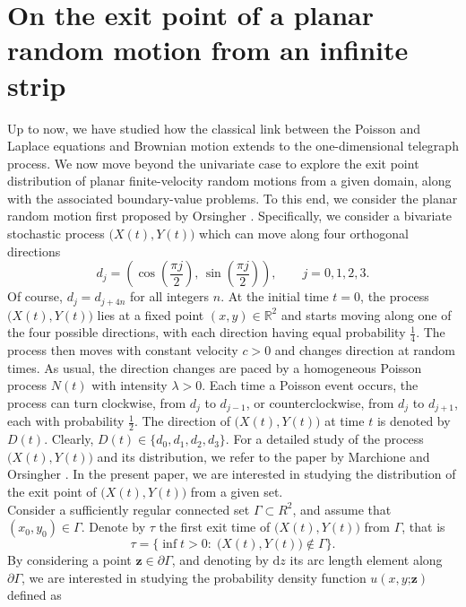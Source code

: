 \documentclass{article}
\begin{document}
\section{On the exit point of a planar random motion from an infinite strip}
Up to now, we have studied how the classical link between the Poisson and Laplace equations and Brownian motion extends to the one-dimensional telegraph process. We now move beyond the univariate case to explore the exit point distribution of planar finite-velocity random motions from a given domain, along with the associated boundary-value problems. To this end, we consider the planar random motion first proposed by Orsingher \cite{orsingher2000exact}. Specifically, we consider a bivariate stochastic process $\big(X(t),Y(t)\big)$ which can move along four orthogonal directions
$$d_j=\left(\cos\left(\frac{\pi j}{2}\right),\,\sin\left(\frac{\pi j}{2}\right)\right),\qquad j=0,1,2,3.$$
Of course, $d_j=d_{j+4n}$ for all integers $n$. At the initial time $t=0$, the process $\big(X(t),Y(t)\big)$ lies at a fixed point $(x,y)\in\mathbb{R}^2$ and starts moving along one of the four possible directions, with each direction having equal probability $\frac{1}{4}$. The process then moves with constant velocity $c>0$ and changes direction at random times. As usual, the direction changes are paced by a homogeneous Poisson process $N(t)$ with intensity $\lambda>0$. Each time a Poisson event occurs, the process can turn clockwise, from $d_j$ to $d_{j-1}$, or counterclockwise, from $d_j$ to $d_{j+1}$, each with probability $\frac{1}{2}$. The direction of $\big(X(t),Y(t)\big)$ at time $t$ is denoted by $D(t)$. Clearly, $D(t)\in\{d_0,d_1,d_2,d_3\}$. For a detailed study of the process $\big(X(t),Y(t)\big)$ and its distribution, we refer to the paper by Marchione and Orsingher \cite{MOcorr}. In the present paper, we are interested in studying the distribution of the exit point of $\big(X(t),Y(t)\big)$ from a given set.\\
\noindent Consider a sufficiently regular connected set $\Gamma\subset{R}^2$, and assume that $(x_0,y_0)\in\Gamma$. Denote by $\tau$ the first exit time of $\big(X(t),Y(t)\big)$ from $\Gamma$, that is \begin{equation}\tau=\{\inf t>0:\;\big(X(t),Y(t)\big)\notin\Gamma\}.\label{bsg}\end{equation}
By considering a point $\mathbf{z}\in\partial \Gamma$, and denoting by $\mathrm{d}z$ its arc length element along $\partial \Gamma$, we are interested in studying the probability density function $u(x,y\mathord{;}\mathbf{z})$ defined as 
\end{document}
